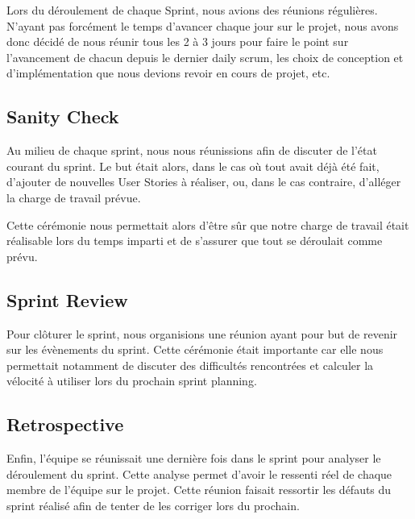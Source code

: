 \documentclass[11pt]{report}
\begin{document}
Lors du déroulement de chaque Sprint, nous avions des réunions régulières. N'ayant pas forcément le temps
d'avancer chaque jour sur le projet, nous avons donc décidé de nous réunir tous les 2 à 3 jours
pour faire le point sur l'avancement de chacun depuis le dernier daily scrum, les choix de conception et d'implémentation que
nous devions revoir en cours de projet, etc.

\subsection{Sanity Check}

Au milieu de chaque sprint, nous nous réunissions afin de discuter de l'état courant du sprint. Le but était alors, dans le cas
où tout avait déjà été fait, d'ajouter de nouvelles User Stories à réaliser, ou, dans le cas contraire, d'alléger la charge
de travail prévue.

Cette cérémonie nous permettait alors d'être sûr que notre charge de travail était réalisable lors du temps imparti
et de s'assurer que tout se déroulait comme prévu.

\subsection{Sprint Review}

Pour clôturer le sprint, nous organisions une réunion ayant pour but de revenir sur les évènements du sprint.
Cette cérémonie était importante car elle nous permettait notamment de discuter des difficultés rencontrées et calculer la vélocité 
à utiliser lors du prochain sprint planning.

\subsection{Retrospective}

Enfin, l'équipe se réunissait une dernière fois dans le sprint pour analyser le déroulement du sprint. Cette analyse permet d'avoir le ressenti réel de chaque membre de l'équipe sur le projet. Cette réunion faisait ressortir les défauts du sprint réalisé afin de tenter de les corriger lors du prochain.
\end{document}
